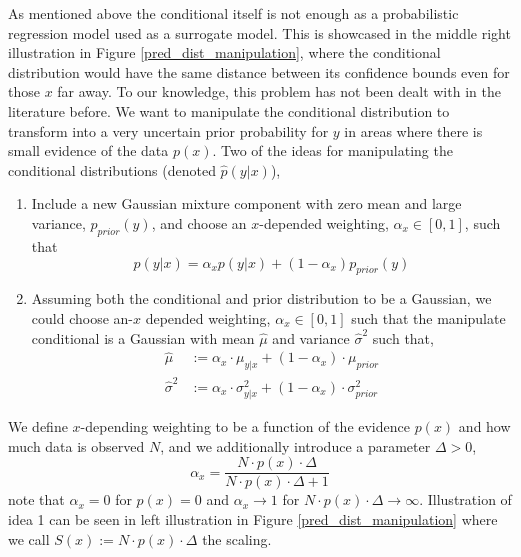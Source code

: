 
As mentioned above the conditional itself is not enough as a probabilistic regression model used as
a surrogate model. This is showcased in the middle right illustration in Figure
\ref{pred_dist_manipulation}, where the conditional distribution would have the same distance
between its confidence bounds even for those $x$ far away. To our knowledge, this problem has not
been dealt with in the literature before. We want to manipulate the conditional distribution to 
transform into a very uncertain prior probability for $y$ in areas
where there is small evidence of the data $p(x)$. Two of the ideas for manipulating the conditional distributions
(denoted $\hat p(y|x)$), %
\begin{enumerate}
    \item Include a new Gaussian mixture component with zero mean and large variance, $p_{prior}(y)$, and 
    choose an $x$-depended weighting, $\alpha_x \in [0,1]$, such that $$\hat p(y|x) = \alpha_x p(y|x) + (1-\alpha_x)p_{prior}(y)$$
    \item Assuming both the conditional and prior distribution to be a Gaussian, we could choose an-$x$ 
    depended weighting, $\alpha_x \in [0,1]$ such that the manipulate conditional is a Gaussian with mean
    $\hat\mu$ and variance $\hat \sigma^2$ such that, 
    \begin{align*}
        \hat \mu &:= \alpha_x \cdot \mu_{y|x} + (1-\alpha_x) \cdot \mu_{prior}\\
        \hat \sigma^2 &:= \alpha_x \cdot \sigma_{y|x}^2 + (1-\alpha_x) \cdot\sigma_{prior}^2
    \end{align*}
\end{enumerate}

We define $x$-depending weighting to be a function of the evidence $p(x)$ and how much data is observed $N$,
and we additionally introduce a parameter $\Delta>0$,
$$\alpha_x = \frac{N\cdot p(x)\cdot \Delta}{N\cdot p(x)\cdot \Delta+1}$$
note that $\alpha_x = 0$ for $p(x) = 0$ and $\alpha_x \rightarrow 1$ for $N\cdot p(x)\cdot \Delta \rightarrow \infty$. 
Illustration of idea 1 can be seen in left illustration in Figure \ref{pred_dist_manipulation} where we call
$S(x) := N\cdot p(x)\cdot \Delta$ the scaling. 

